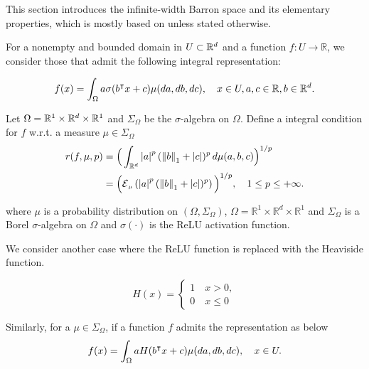 This section introduces the infinite-width Barron space and its elementary
properties, which is mostly based on \cite{eBarronSpaceFlowinduced2021} unless
stated otherwise.

For a nonempty and bounded domain in $U \subset \mathbb{R}^d$ and a function $f: U
\to \mathbb{R}$, we consider those that admit the following integral
representation:

\begin{equation}
    \label{eq:barron_represent}
    f(x) = \int_{\Omega} a \sigma(b{}^{\intercal} x + c) \mu(da, db, dc), \quad 
    x \in U, a,c \in \mathbb{R}, b \in \mathbb{R}^d.
\end{equation}

Let $\Omega = \mathbb{R}^1 \times \mathbb{R}^d \times \mathbb{R}^1$ and $\Sigma_{\Omega}$ be the
$\sigma$-algebra on $\Omega$. Define a integral condition for $f$ w.r.t. a
measure $\mu \in \Sigma_{\Omega}$
\begin{align}
    r(f, \mu, p)
    &= \Big(\int_{\R^d} \abs{a}^p  (\norm{b}_1 + \abs{c})^p \,d\mu(a,b,c)\Big)^{1/p} \\
    &= \Big(\ERWi{\mu}{\abs{a}^p  (\norm{b}_1 + \abs{c})^p}\Big)^{1/p},
    \quad 1 \leq p \leq +\infty.
\end{align}

where $\mu$ is a probability distribution on $(\Omega, \Sigma_\Omega)$, $\Omega
= \mathbb{R}^1 \times \mathbb{R}^d \times \mathbb{R}^1$ and $\Sigma_\Omega$ is a
Borel $\sigma$-algebra on $\Omega$ and $\sigma(\cdot)$ is the ReLU activation
function.

We consider another case where the ReLU function is replaced with the Heaviside
function.

\begin{definition}
    \label{eq:heaviside_represent}
    \begin{equation}
        H(x) = 
        \begin{cases}
            1 \quad x > 0,\\
            0 \quad x \leq 0    
        \end{cases}
    \end{equation}
\end{definition}


Similarly, for a $\mu \in \Sigma_{\Omega}$, if a function $f$ admits the
representation as below
\begin{equation}
    \label{eq:heaviside_represent}
    f(x) = \int_{\Omega} a H(b{}^{\intercal} x + c) \mu(da, db, dc), \quad x \in U.
\end{equation}

